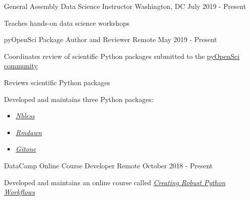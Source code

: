 \begin{cventries}
  \cventry
    {General Assembly} %
    {Data Science Instructor} %
    {Washington, DC} %
    {July 2019 - Present} %
    {
      \begin{cvitems} %
        \item {Teaches hands-on data science workshops}
      \end{cvitems}
    }

  \cventry
    {pyOpenSci} %
    {Package Author and Reviewer} %
    {Remote} %
    {May 2019 - Present} %
    {
      \begin{cvitems} %
        \item Coordinates review of scientific Python packages submitted to the \href{https://www.pyopensci.org/}{\textcolor{awesome-skyblue}{pyOpenSci} community}
        \item Reviews scientific Python packages
        \item Developed and maintains three Python packages: \\
            \begin{minipage}[t]{0.15\textwidth}
             \begin{itemize}
                  \item{ \href{https://marskar.github.io/nbless/readme.html}{\textit{\textcolor{awesome-skyblue}{Nbless}}}} 
             \end{itemize}
            \end{minipage}
            \begin{minipage}[t]{0.15\textwidth}
             \begin{itemize}
                  \item{ \href{https://marskar.github.io/rmdawn/readme.html}{\textit{\textcolor{awesome-skyblue}{Rmdawn}}}}
             \end{itemize}
            \end{minipage}
            \begin{minipage}[t]{0.15\textwidth}
             \begin{itemize}
                  \item{ \href{https://marskar.github.io/gitone/readme.html}{\textit{\textcolor{awesome-skyblue}{Gitone}}}}
             \end{itemize}
            \end{minipage}
      \end{cvitems}
    }

  \cventry
    {DataCamp} %
    {Online Course Developer} %
    {Remote} %
    {October 2018 - Present} %
    {
      \begin{cvitems} %
        \item Developed and maintains an online course called \href{https://www.datacamp.com/courses/creating-robust-python-workflows}{\textit{\textcolor{awesome-skyblue}{Creating Robust Python Workflows}}}
      \end{cvitems}
    }


\end{cventries}
